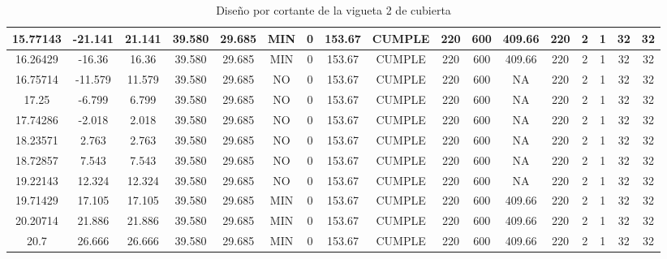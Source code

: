 \begin{table}[h]
{\begin{tabular}{|c|c|c|c|c|c|c|c|c|c|c|c|c|c|c|c|c|}
    \hline
    15.77143 & -21.141 & 21.141 & 39.580 & 29.685 & MIN & 0   & 153.67 & CUMPLE & 220 & 600 & 409.66 & 220 & 2   & 1   & 32  & 32 \bigstrut\\
    \hline
    16.26429 & -16.36 & 16.36 & 39.580 & 29.685 & MIN & 0   & 153.67 & CUMPLE & 220 & 600 & 409.66 & 220 & 2   & 1   & 32  & 32 \bigstrut\\
    \hline
    16.75714 & -11.579 & 11.579 & 39.580 & 29.685 & NO  & 0   & 153.67 & CUMPLE & 220 & 600 & NA  & 220 & 2   & 1   & 32  & 32 \bigstrut\\
    \hline
    17.25 & -6.799 & 6.799 & 39.580 & 29.685 & NO  & 0   & 153.67 & CUMPLE & 220 & 600 & NA  & 220 & 2   & 1   & 32  & 32 \bigstrut\\
    \hline
    17.74286 & -2.018 & 2.018 & 39.580 & 29.685 & NO  & 0   & 153.67 & CUMPLE & 220 & 600 & NA  & 220 & 2   & 1   & 32  & 32 \bigstrut\\
    \hline
    18.23571 & 2.763 & 2.763 & 39.580 & 29.685 & NO  & 0   & 153.67 & CUMPLE & 220 & 600 & NA  & 220 & 2   & 1   & 32  & 32 \bigstrut\\
    \hline
    18.72857 & 7.543 & 7.543 & 39.580 & 29.685 & NO  & 0   & 153.67 & CUMPLE & 220 & 600 & NA  & 220 & 2   & 1   & 32  & 32 \bigstrut\\
    \hline
    19.22143 & 12.324 & 12.324 & 39.580 & 29.685 & NO  & 0   & 153.67 & CUMPLE & 220 & 600 & NA  & 220 & 2   & 1   & 32  & 32 \bigstrut\\
    \hline
    19.71429 & 17.105 & 17.105 & 39.580 & 29.685 & MIN & 0   & 153.67 & CUMPLE & 220 & 600 & 409.66 & 220 & 2   & 1   & 32  & 32 \bigstrut\\
    \hline
    20.20714 & 21.886 & 21.886 & 39.580 & 29.685 & MIN & 0   & 153.67 & CUMPLE & 220 & 600 & 409.66 & 220 & 2   & 1   & 32  & 32 \bigstrut\\
    \hline
    20.7 & 26.666 & 26.666 & 39.580 & 29.685 & MIN & 0   & 153.67 & CUMPLE & 220 & 600 & 409.66 & 220 & 2   & 1   & 32  & 32 \bigstrut\\
    \hline
    \end{tabular}}%
    \caption{Diseño por cortante de la vigueta 2 de cubierta}
  \label{tab:CORT VT2 CUB}%
\end{table}%
